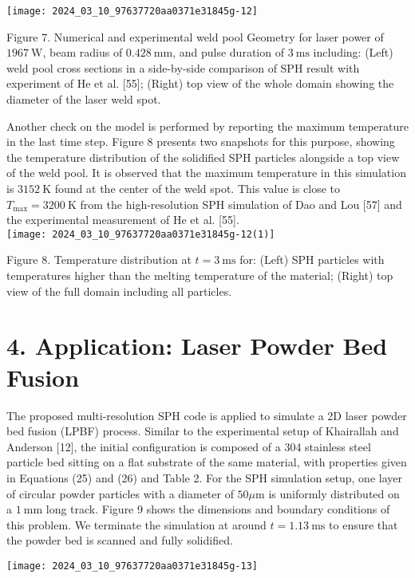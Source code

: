 \documentclass[10pt]{article}
\begin{document}
\begin{center}
\texttt{[image: 2024\_03\_10\_97637720aa0371e31845g-12]}
\end{center}

Figure 7. Numerical and experimental weld pool Geometry for laser power of $1967 \mathrm{~W}$, beam radius of $0.428 \mathrm{~mm}$, and pulse duration of $3 \mathrm{~ms}$ including: (Left) weld pool cross sections in a side-by-side comparison of SPH result with experiment of He et al. [55]; (Right) top view of the whole domain showing the diameter of the laser weld spot.

Another check on the model is performed by reporting the maximum temperature in the last time step. Figure 8 presents two snapshots for this purpose, showing the temperature distribution of the solidified SPH particles alongside a top view of the weld pool. It is observed that the maximum temperature in this simulation is $3152 \mathrm{~K}$ found at the center of the weld spot. This value is close to $T_{\max }=3200 \mathrm{~K}$ from the high-resolution SPH simulation of Dao and Lou [57] and the experimental measurement of He et al. [55].\\
\texttt{[image: 2024\_03\_10\_97637720aa0371e31845g-12(1)]}

Figure 8. Temperature distribution at $t=3 \mathrm{~ms}$ for: (Left) SPH particles with temperatures higher than the melting temperature of the material; (Right) top view of the full domain including all particles.

\section*{4. Application: Laser Powder Bed Fusion}
The proposed multi-resolution SPH code is applied to simulate a 2D laser powder bed fusion (LPBF) process. Similar to the experimental setup of Khairallah and Anderson [12], the initial configuration is composed of a 304 stainless steel particle bed sitting on a flat substrate of the same material, with properties given in Equations (25) and (26) and Table 2. For the SPH simulation setup, one layer of circular powder particles with a diameter of $50 \mu \mathrm{m}$ is uniformly distributed on a $1 \mathrm{~mm}$ long track. Figure 9 shows the dimensions and boundary conditions of this problem. We terminate the simulation at around $t=1.13 \mathrm{~ms}$ to ensure that the powder bed is scanned and fully solidified.

\begin{center}
\texttt{[image: 2024\_03\_10\_97637720aa0371e31845g-13]}
\end{center}
\end{document}
